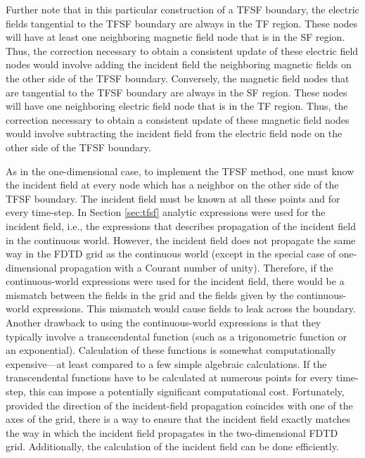 Further note that in this particular construction of a TFSF boundary,
the electric fields tangential to the TFSF boundary are always in the
TF region.  These nodes will have at least one neighboring magnetic
field node that is in the SF region.  Thus, the correction necessary
to obtain a consistent update of these electric field nodes would
involve adding the incident field the neighboring magnetic fields on
the other side of the TFSF boundary.  Conversely, the magnetic field
nodes that are tangential to the TFSF boundary are always in the SF
region.  These nodes will have one neighboring electric field node
that is in the TF region.  Thus, the correction necessary to obtain a
consistent update of these magnetic field nodes would involve
subtracting the incident field from the electric field node on the
other side of the TFSF boundary.

As in the one-dimensional case, to implement the TFSF method, one must
know the incident field at every node which has a neighbor on the
other side of the TFSF boundary.  The incident field must be known at
all these points and for every time-step.  In Section \ref{sec:tfsf}
analytic expressions were used for the incident field, i.e., the
expressions that describes propagation of the incident field in the
continuous world.  However, the incident field does not propagate the
same way in the FDTD grid as the continuous world (except in the
special case of one-dimensional propagation with a Courant number of
unity).  Therefore, if the continuous-world expressions were used for
the incident field, there would be a mismatch between the fields in
the grid and the fields given by the continuous-world expressions.
This mismatch would cause fields to leak across the boundary.  Another
drawback to using the continuous-world expressions is that they
typically involve a transcendental function (such as a trigonometric
function or an exponential).  Calculation of these functions is
somewhat computationally expensive---at least compared to a few simple
algebraic calculations.  If the transcendental functions have to be
calculated at numerous points for every time-step, this can impose a
potentially significant computational cost.  Fortunately, provided the
direction of the incident-field propagation coincides with one of the
axes of the grid, there is a way to ensure that the incident field
exactly matches the way in which the incident field propagates in the
two-dimensional FDTD grid.  Additionally, the calculation of the
incident field can be done efficiently.


